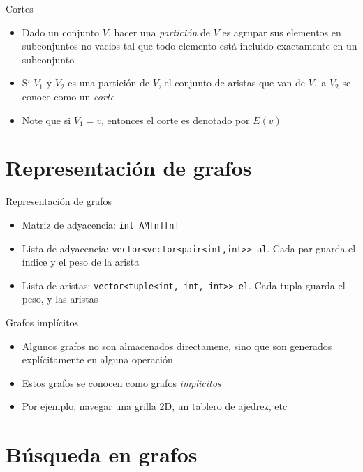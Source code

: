 \documentclass[]{beamer}
\begin{document}
\begin{frame}{Cortes}
  \begin{itemize}
    \item Dado un conjunto $V$, hacer una \textit{partici\'on} de $V$ es agrupar sus elementos en subconjuntos no vacios tal que todo elemento est\'a incluido exactamente en un subconjunto
      \pause
    \item Si $V_1$ y $V_2$ es una partici\'on de $V$, el conjunto de aristas que van de $V_1$ a $V_2$ se conoce como un \textit{corte}
      \pause
    \item Note que si $V_1 = { v }$, entonces el corte es denotado por $E(v)$
  \end{itemize}
\end{frame}

\section{Representaci\'on de grafos}
\begin{frame}{Representaci\'on de grafos}
  \begin{itemize}
    \item Matriz de adyacencia: \texttt{int AM[n][n]}
      \pause
    \item Lista de adyacencia: \texttt{vector<vector<pair<int,int>> al}. Cada par guarda el \'indice y el peso de la arista
      \pause
    \item Lista de aristas: \texttt{vector<tuple<int, int, int>> el}. Cada tupla guarda el peso, y las aristas
  \end{itemize}
\end{frame}

\begin{frame}{Grafos impl\'icitos}
  \begin{itemize}
    \item Algunos grafos no son almacenados directamene, sino que son generados expl\'icitamente en alguna operaci\'on
      \pause
    \item Estos grafos se conocen como grafos \textit{impl\'icitos}
      \pause
    \item Por ejemplo, navegar una grilla 2D, un tablero de ajedrez, etc
  \end{itemize}
\end{frame}

\section{B\'usqueda en grafos}
\end{document}
